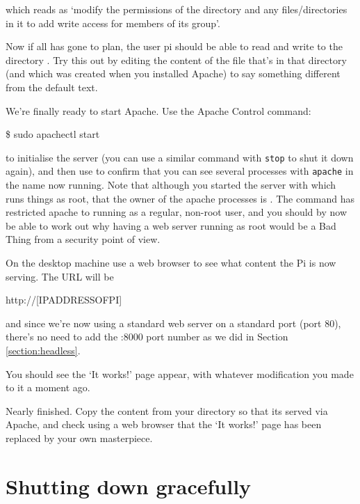 which reads as `modify the permissions of the directory  and any files/directories in it to add write access for members of its group'.

Now if all has gone to plan, the user pi should be able to read and write to the directory . Try this out by editing the content of the  file that's in that directory (and which was created when you installed Apache) to say something different from the default text.

We're finally ready to start Apache. Use the Apache Control command:

\begin{ttoutenv}
\$ sudo apachectl start
\end{ttoutenv}

to initialise the server (you can use a similar command with \texttt{stop} to shut it down again), and then use  to confirm that you can see several processes with \texttt{apache} in the name now running. Note that although you started the server with  which runs things as root, that the owner of the apache processes is . The  command has restricted apache to running as a regular, non-root user, and you should by now be able to work out why having a web server running as root would be a Bad Thing from a security point of view.

On the desktop machine use a web browser to see what content the Pi is now serving. The URL will be

\begin{ttoutenv}
http://[IPADDRESSOFPI]
\end{ttoutenv}

and since we're now using a standard web server on a standard port (port 80), there's no need to add the :8000 port number as we did in Section \ref{section:headless}.

You should see the `It works!' page appear, with whatever modification you made to it a moment ago.

Nearly finished. Copy the content from your  directory so that its served via Apache, and check using a web browser that the `It works!' page has been replaced by your own masterpiece.

\section{Shutting down gracefully}

